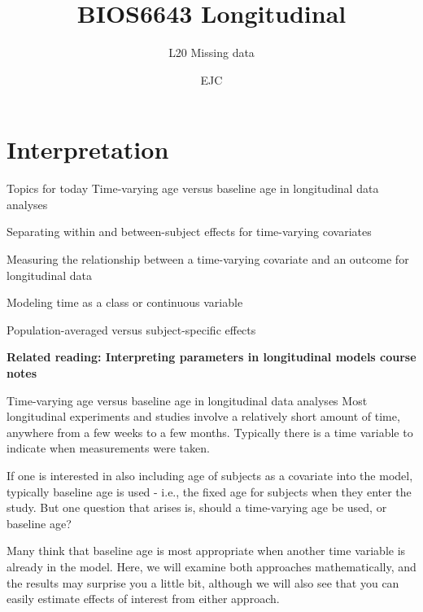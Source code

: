 \documentclass[
  9pt,
  ignorenonframetext,
]{beamer}
\title{BIOS6643 Longitudinal}
\subtitle{L20 Missing data}
\author{EJC}
\date{}
\institute{Department of Biostatistics \& Informatics}
\begin{document}
\frame{\titlepage}

\begin{frame}[allowframebreaks]
  \tableofcontents[hideallsubsections]
\end{frame}
\hypertarget{interpretation}{%
\section{Interpretation}\label{interpretation}}

\begin{frame}{Topics for today}
\protect\hypertarget{topics-for-today}{}
Time-varying age versus baseline age in longitudinal data analyses

Separating within and between-subject effects for time-varying
covariates

Measuring the relationship between a time-varying covariate and an
outcome for longitudinal data

Modeling time as a class or continuous variable

Population-averaged versus subject-specific effects

\vspace{\baselineskip}

\textbf{Related reading: Interpreting parameters in longitudinal models
course notes}
\end{frame}

\begin{frame}{Time-varying age versus baseline age in longitudinal data
analyses}
\protect\hypertarget{time-varying-age-versus-baseline-age-in-longitudinal-data-analyses}{}
Most longitudinal experiments and studies involve a relatively short
amount of time, anywhere from a few weeks to a few months. Typically
there is a time variable to indicate when measurements were taken.

If one is interested in also including age of subjects as a covariate
into the model, typically baseline age is used - i.e., the fixed age for
subjects when they enter the study. But one question that arises is,
should a time-varying age be used, or baseline age?

Many think that baseline age is most appropriate when another time
variable is already in the model. Here, we will examine both approaches
mathematically, and the results may surprise you a little bit, although
we will also see that you can easily estimate effects of interest from
either approach.
\end{frame}
\end{document}
